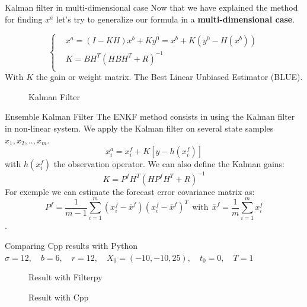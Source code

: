 \begin{frame}{Kalman filter in multi-dimensional case}
   Now that we have explained the method for finding $x^a$ let's try to generalize our formula in a \textbf{multi-dimensional case}.

   $$\left\{\begin{aligned}
     &x^a=(I-KH)x^b+Ky^0=x^b+K(y^0-H(x^b)) \\
           &K=BH^T(HBH^T+R)^{-1} \\
    \end{aligned}\right.$$
   With $K$ the gain or weight matrix.
   The Best Linear Unbiased Estimator (BLUE).
   \begin{figure}[H]
       \caption{Kalman Filter}
   \end{figure}
\end{frame}
\begin{frame}{Ensemble Kalman Filter}
   The ENKF method consists in using the Kalman filter in non-linear system.
   \newline We apply the Kalman filter on several state samples $x_1,x_2,..,x_{m}$.
   $$x_i^a=x_i^f+K[y-h(x_i^f)]$$
   with $h(x_i^f)$ the observation operator.
   We can also define the Kalman gains: 
   $$K=P^f H^T(HP^f H^T+R)^{-1}$$
   For exemple we can estimate the
   forecast error covariance matrix as:
   $$P^f=\frac{1}{m-1}\sum_{i=1}^{m}(x_i^f-\bar{x}^f)(x_i^f-\bar{x}^f)^T~~\text{with}~~\bar{x}^f=\frac{1}{m}\sum_{i=1}^{m}x_i^f $$ .
\end{frame}
\begin{frame}{Comparing Cpp results with Python}
	\centering
$\sigma=12, \quad b=6, \quad r=12, \quad X_0=(-10,-10,25), \quad t_0=0, \quad T=1$
\begin{minipage}{0.48\linewidth}
	\begin{figure}[H]
		\caption{Result with Filterpy}
	\end{figure}
\end{minipage}
\begin{minipage}{0.48\linewidth}
	\begin{figure}[H]
		\caption{Result with Cpp}
	\end{figure}
\end{minipage}
\end{frame}
